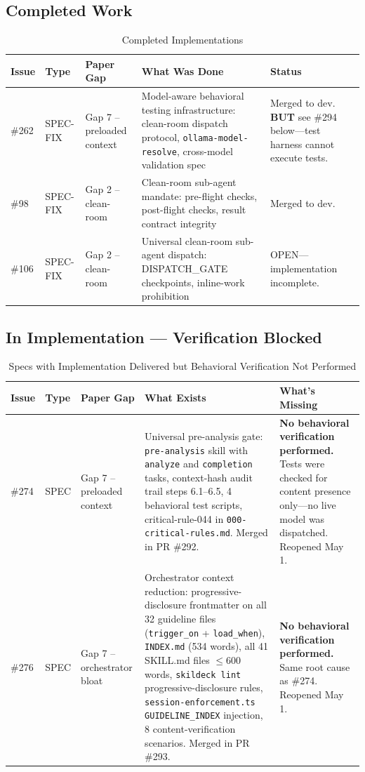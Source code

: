 \documentclass[11pt,a4paper]{article}
\begin{document}
\subsection{Completed Work}

\begin{table}[htbp]
\centering
\caption{Completed Implementations}
\small
\begin{tabular}{@{}p{0.8cm}llp{4cm}p{5cm}@{}}
\toprule
\textbf{Issue} & \textbf{Type} & \textbf{Paper Gap} & \textbf{What Was Done} & \textbf{Status} \\
\midrule
\#262 & SPEC-FIX & Gap 7 -- preloaded context & Model-aware behavioral testing infrastructure: clean-room dispatch protocol, \texttt{ollama-model-resolve}, cross-model validation spec & Merged to dev. \textbf{BUT} see \#294 below---test harness cannot execute tests. \\
\midrule
\#98 & SPEC-FIX & Gap 2 -- clean-room & Clean-room sub-agent mandate: pre-flight checks, post-flight checks, result contract integrity & Merged to dev. \\
\midrule
\#106 & SPEC-FIX & Gap 2 -- clean-room & Universal clean-room sub-agent dispatch: DISPATCH\_GATE checkpoints, inline-work prohibition & OPEN---implementation incomplete. \\
\bottomrule
\end{tabular}
\end{table}

\subsection{In Implementation --- Verification Blocked}

\begin{table}[htbp]
\centering
\caption{Specs with Implementation Delivered but Behavioral Verification Not Performed}
\small
\begin{tabular}{@{}p{0.8cm}llp{4cm}p{5cm}@{}}
\toprule
\textbf{Issue} & \textbf{Type} & \textbf{Paper Gap} & \textbf{What Exists} & \textbf{What's Missing} \\
\midrule
\#274 & SPEC & Gap 7 -- preloaded context & Universal pre-analysis gate: \texttt{pre-analysis} skill with \texttt{analyze} and \texttt{completion} tasks, context-hash audit trail steps 6.1--6.5, 4 behavioral test scripts, critical-rule-044 in \texttt{000-critical-rules.md}.  Merged in PR \#292. & \textbf{No behavioral verification performed.}  Tests were checked for content presence only---no live model was dispatched.  Reopened May 1. \\
\midrule
\#276 & SPEC & Gap 7 -- orchestrator bloat & Orchestrator context reduction: progressive-disclosure frontmatter on all 32 guideline files (\texttt{trigger\_on} + \texttt{load\_when}), \texttt{INDEX.md} (534 words), all 41 SKILL.md files $\leq$600 words, \texttt{skildeck lint} progressive-disclosure rules, \texttt{session-enforcement.ts} \texttt{GUIDELINE\_INDEX} injection, 8 content-verification scenarios.  Merged in PR \#293. & \textbf{No behavioral verification performed.}  Same root cause as \#274.  Reopened May 1. \\
\bottomrule
\end{tabular}
\end{table}
\end{document}

